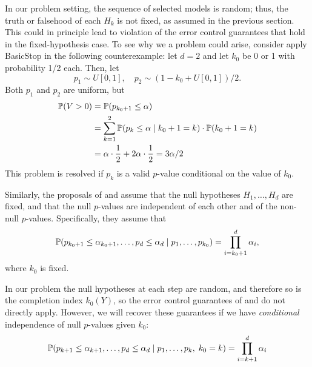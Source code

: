 \documentclass{article}
\begin{document}
In our problem setting, the sequence of selected models is random; thus, the truth or falsehood of each $H_k$ is not fixed, as assumed in the previous section. This could in principle lead to violation of the error control guarantees that hold in the fixed-hypothesis case.
To see why we a problem could arise, consider apply BasicStop in the following counterexample: let $d=2$ and let $k_0$ be 0 or 1 with probability 1/2 each. Then, let 
\[
p_1 \sim U[0,1], \quad p_2 \sim (1-k_0 + U[0,1])/2.
\]
Both $p_1$ and $p_2$ are uniform, but
\begin{align*}
\P(V>0) &= \P(p_{k_0+1} \leq \alpha)\\ 
&= \sum_{k=1}^2\P(p_k\leq \alpha \mid k_0+1=k)\cdot \P(k_0+1=k)\\
&= \alpha\cdot \frac{1}{2} + 2\alpha \cdot \frac{1}{2} = 3\alpha/2
\end{align*}
This problem is resolved if $p_k$ is a valid $p$-value conditional on the value of $k_0$.

Similarly, the proposals of  \citet{gsell2013sequential} and \citet{li2015accumulation} assume that the null hypotheses $H_{1}, \ldots, H_{d}$ are fixed, and that the null $p$-values are independent of each other and of the non-null $p$-values. Specifically, they assume that
\begin{equation}\label{eq:indepCond_fixed_k0}
\P(p_{k_0+1} \leq \alpha_{k_0+1}, \ldots, p_d \leq \alpha_d
\mid p_1, \ldots, p_{k_0}) = \prod_{i=k_0+1}^d \alpha_i,
\end{equation}
where $k_0$ is fixed. 

In our problem the null hypotheses at each step are random, and therefore so is the completion index $k_0(Y)$, so the error control guarantees of \citet{gsell2013sequential} and \citet{li2015accumulation} do not directly apply. However, we will recover these guarantees if we have {\em conditional} independence of null $p$-values given $k_0$:
\begin{equation}\label{eq:indepCond_random_k0}
  \P(p_{k+1} \leq \alpha_{k+1}, \ldots, p_d \leq \alpha_d
  \mid p_1, \ldots, p_k, \; k_0 = k) = \prod_{i=k+1}^d \alpha_i
\end{equation}
\end{document}
